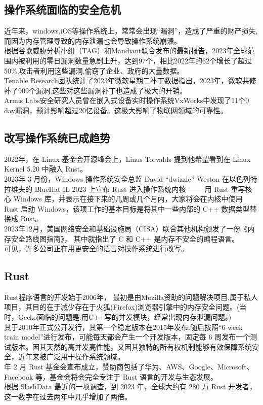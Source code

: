 \documentclass{ctexart}
\begin{document}
\subsection{操作系统面临的安全危机}
近年来，windows,iOS等操作系统上，常常会出现“漏洞”，造成了严重的财产损失,而因为内存管理导致的内存泄漏也会导致操作系统崩溃。\\
\indent 根据谷歌威胁分析小组（TAG）和Mandiant联合发布的最新报告，2023年全球范围内被利用的零日漏洞数量急剧上升，达到97个，相比2022年的62个增长了超过50\%,攻击者利用这些漏洞,偷窃了企业、政府的大量数据。\\
\indent Tenable Research团队统计了2023年微软星期二补丁数据指出，2023年，微软共修补了909个漏洞,这些对这些漏洞补丁也造成了极大的开销。\\
\indent Armis Labs安全研究人员曾在嵌入式设备实时操作系统VxWorks中发现了11个0 day漏洞，预计影响超过20亿设备。这极大影响了物联网领域的可靠性。
\subsection{改写操作系统已成趋势}
2022年，在 Linux 基金会开源峰会上，Linus Torvalds 提到他希望看到在 Linux Kernel 5.20 中融入 Rust。\\
\indent 2023年  3 月份，Windows 操作系统安全总监 David “dwizzle” Weston 在以色列特拉维夫的 BlueHat IL 2023 上宣布 Rust 进入操作系统内核 —— 用 Rust 重写核心 Windows 库，并表示在接下来的几周或几个月内，大家将会在内核中使用 Rust 启动 Windows，该项工作的基本目标是将其中一些内部的 C++ 数据类型替换成 Rust。\\
\indent 2023年12月，美国网络安全和基础设施局（CISA）联合其他机构颁发了一份《内存安全路线图指南》， 其中就指出了 C 和 C++ 是内存不安全的编程语言。\\
\indent 可见，许多公司正在用更安全的语言对操作系统进行改写。
\subsection{Rust}
Rust程序语言的开发始于2006年， 最初是由Mozilla资助的问题解决项目,属于私人项目，其目的在于减少存在于火狐(Firefox)浏览器引擎中的内存安全问题。(当时，Gecko面临的问题是:用C++写的并发模块，经常出现内存泄漏问题。) \\
\indent 其于2010年正式公开发行，其第一个稳定版本在2015年发布.随后按照“6-week train model”进行发布，可能每天都会产生一个开发版本，固定每 6 周发布一个测试版本。因其天然的高并发高性能，又因其独特的所有权机制能够有效保障系统安全，近年来被广泛用于操作系统领域。\\
 年 2 月 Rust 基金会宣布成立，赞助商包括了华为、AWS、Google、Microsoft、Facebook 等，基金会将会完全专注于 Rust 语言的开发与生态发展。\\
\indent 根据 SlashData 最近的一项调查，到 2023 年，全球大约有 280 万 Rust 开发者，这一数字在过去两年中几乎增加了两倍。
\end{document}
